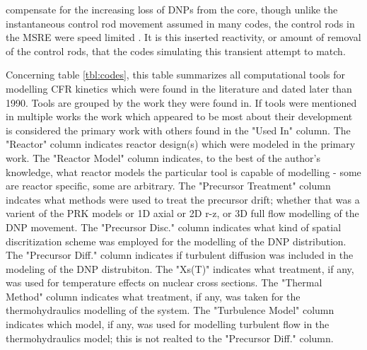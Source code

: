 \documentclass[review]{elsarticle}
\begin{document}
compensate for the increasing loss of DNPs from the core, though unlike the
instantaneous control rod movement assumed in many codes, 
the control rods in the
MSRE were speed limited \cite{krepel_dyn3d-msr_2007}. It is this inserted
reactivity, or amount of removal of the control rods, that the codes simulating
this transient attempt to match.
\par Concerning table \ref{tbl:codes}, this table summarizes all computational
tools for modelling CFR kinetics which were
found in the literature and dated later than 1990. Tools are grouped by the
work they were found in. If tools were mentioned in multiple works the
work which appeared to be most about their development is considered
the primary work with others found in the "Used In" column. The
"Reactor" column indicates reactor design(s) which were modeled in
the primary work. The "Reactor Model" column indicates, to the best
of the author's knowledge, what reactor models the particular tool is
capable of modelling - some are reactor specific, some are arbitrary.
The "Precursor Treatment" column indcates what methods were used to
treat the precursor drift; whether that was a varient of the PRK models
or 1D axial or 2D r-z, or 3D full flow modelling of the DNP movement.
The "Precursor Disc." column indicates what kind of spatial
discritization scheme was employed for the modelling of the DNP distribution.
The "Precursor Diff." column indicates if turbulent diffusion was included in
the modeling of the DNP distrubiton. The "Xs(T)" indicates what treatment, if
any, was used for temperature effects on nuclear cross sections. The
"Thermal Method" column indicates what treatment, if any, was taken for the
thermohydraulics modelling of the system. The "Turbulence Model" column
indicates which model, if any, was used for modelling turbulent flow in the
thermohydraulics model; this is not realted to the "Precursor Diff." column.
\end{document}
